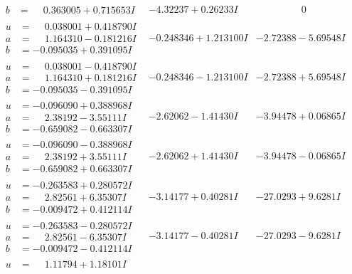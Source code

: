 \documentclass[1p]{elsarticle_modified}
\theoremstyle{definition}
\begin{document}
$$\begin{array}{c|c|c}
\begin{aligned}
b &= \phantom{-}0.363005 + 0.715653 I\end{aligned}
 & -4.32237 + 0.26233 I & \phantom{-0.000000 } 0 \\ \hline\begin{aligned}
u &= \phantom{-}0.038001 + 0.418790 I \\
a &= \phantom{-}1.164310 - 0.181216 I \\
b &= -0.095035 + 0.391095 I\end{aligned}
 & -0.248346 + 1.213100 I & -2.72388 - 5.69548 I \\ \hline\begin{aligned}
u &= \phantom{-}0.038001 - 0.418790 I \\
a &= \phantom{-}1.164310 + 0.181216 I \\
b &= -0.095035 - 0.391095 I\end{aligned}
 & -0.248346 - 1.213100 I & -2.72388 + 5.69548 I \\ \hline\begin{aligned}
u &= -0.096090 + 0.388968 I \\
a &= \phantom{-}2.38192 - 3.55111 I \\
b &= -0.659082 - 0.663307 I\end{aligned}
 & -2.62062 - 1.41430 I & -3.94478 + 0.06865 I \\ \hline\begin{aligned}
u &= -0.096090 - 0.388968 I \\
a &= \phantom{-}2.38192 + 3.55111 I \\
b &= -0.659082 + 0.663307 I\end{aligned}
 & -2.62062 + 1.41430 I & -3.94478 - 0.06865 I \\ \hline\begin{aligned}
u &= -0.263583 + 0.280572 I \\
a &= \phantom{-}2.82561 + 6.35307 I \\
b &= -0.009472 + 0.412114 I\end{aligned}
 & -3.14177 + 0.40281 I & -27.0293 + 9.6281 I \\ \hline\begin{aligned}
u &= -0.263583 - 0.280572 I \\
a &= \phantom{-}2.82561 - 6.35307 I \\
b &= -0.009472 - 0.412114 I\end{aligned}
 & -3.14177 - 0.40281 I & -27.0293 - 9.6281 I \\ \hline\begin{aligned}
u &= \phantom{-}1.11794 + 1.18101 I \\

\end{aligned}
\end{array}$$
\end{document}

